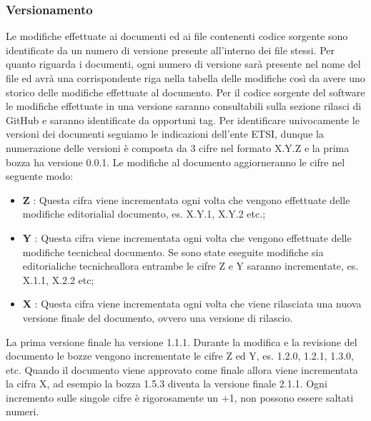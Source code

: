 	\subsubsection{Versionamento}
		Le modifiche effettuate ai documenti ed ai file contenenti codice sorgente sono identificate da un numero di versione presente all'interno dei file stessi. Per quanto riguarda i documenti, ogni numero di versione sarà presente nel nome del file ed avrà una corrispondente riga nella tabella delle modifiche così da avere uno storico delle modifiche effettuate al documento. Per il codice sorgente del software le modifiche effettuate in una versione saranno consultabili sulla sezione rilasci di GitHub e saranno identificate da opportuni tag.
		\newline
		Per identificare univocamente le versioni dei documenti seguiamo le indicazioni dell'ente ETSI, dunque la numerazione delle versioni è composta da 3 cifre nel formato X.Y.Z e la prima bozza ha versione 0.0.1. Le modifiche al documento aggiorneranno le cifre nel seguente modo:
		\begin{itemize}
			\item \textbf{Z} : Questa cifra viene incrementata ogni volta che vengono effettuate delle modifiche editoriali\glosp al documento, es. X.Y.1, X.Y.2 etc.;
			\item \textbf{Y} : Questa cifra viene incrementata ogni volta che vengono effettuate delle modifiche tecniche\glosp al documento. Se sono state eseguite modifiche sia editoriali\glosp che tecniche\glosp allora entrambe le cifre Z e Y saranno incrementate, es. X.1.1, X.2.2 etc;
			\item \textbf{X} : Questa cifra viene incrementata ogni volta che viene rilasciata una nuova versione finale del documento, ovvero una versione di rilascio.			
		\end{itemize}
		La prima versione finale ha versione 1.1.1.
		\newline
		Durante la modifica e la revisione del documento le bozze vengono incrementate le cifre Z ed Y, es. 1.2.0, 1.2.1, 1.3.0, etc.
		\newline
		Quando il documento viene approvato come finale allora viene incrementata la cifra X, ad esempio la bozza 1.5.3 diventa la versione finale 2.1.1.
		\newline
		Ogni incremento sulle singole cifre è rigorosamente un +1, non possono essere saltati numeri.
		
